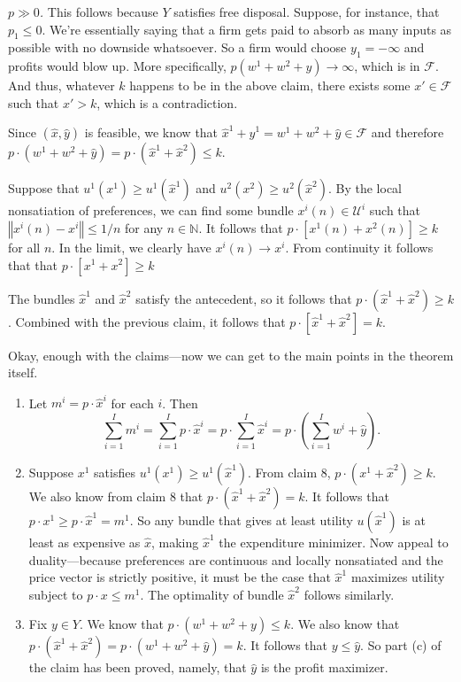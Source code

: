 \documentclass[12pt]{article}
\newcommand{\norm}[1]{\left\Vert{#1}\right\Vert}
\newcommand{\N}{\mathbb{N}}
\newcommand{\sumi}{\sum_{i=1}^I}
\theoremstyle{definition}
\begin{document}
\begin{claim}
	\emph{$p \gg 0$.} This follows because $Y$ satisfies free disposal. Suppose, for instance, that $p_1 \leq 0$. We're essentially saying that a firm gets paid to absorb as many inputs as possible with no downside whatsoever. So a firm would choose $y_1 = -\infty$ and profits would blow up. More specifically, $p (w^1 + w^2 + y) \rightarrow \infty$, which is in $\mathcal{F}$. And thus, whatever $k$ happens to be in the above claim, there exists some $x' \in \mathcal{F}$ such that $x' > k$, which is a contradiction. 
\end{claim}

\begin{claim}
	Since $(\hat{x}, \hat{y})$ is feasible, we know that $\hat{x}^1 + \hat{y}^1  = w^1 + w^2 + \hat{y} \in \mathcal{F}$ and therefore $p \cdot  (w^1 + w^2 + \hat{y}) = p \cdot (\hat{x}^1 + \hat{x}^2) \leq k$.
\end{claim}

\begin{claim}
	Suppose that $u^1(x^1) \geq u^1(\hat{x}^1)$ and $u^2(x^2) \geq u^2(\hat{x}^2)$. By the local nonsatiation of preferences, we can find some bundle $x^i(n) \in \mathcal{U}^i$ such that $\norm{x^i(n) - x^i} \leq 1/n$ for any $n \in \N$. It follows that $p \cdot[ x^1(n)+x^2(n)] \geq k$ for all $n$. In the limit, we clearly have $x^i(n) \rightarrow x^i$. From continuity it follows that that $p \cdot[ x^1+x^2] \geq k$
	
	The bundles $\hat{x}^1$ and $\hat{x}^2$ satisfy the antecedent, so it follows that $p \cdot ( \hat{x}^1+\hat{x}^2 ) \geq k$. Combined with the previous claim, it follows that $p \cdot[ \hat{x}^1+\hat{x}^2] = k$.
\end{claim}


Okay, enough with the claims---now we can get to the main points in the theorem itself.
\begin{enumerate}
	\item Let $m^i = p \cdot \hat{x}^i$ for each $i$. Then
		\[\sumi m^i = \sumi p \cdot \hat{x}^i = p  \cdot  \sumi \hat{x}^i = p\cdot \left(\sumi w^i + \hat{y} \right).	\]
	\item Suppose $x^1$ satisfies $u^1(x^1) \geq u^1(\hat{x}^1)$. From claim 8, $p \cdot (x^1 + \hat{x}^2) \geq k$. We also know from claim 8 that $p \cdot ( \hat{x}^1 + \hat{x}^2) = k$. It follows that $p \cdot x^1 \geq p \cdot \hat{x}^1 = m^1$. So any bundle that gives at least utility $u( \hat{x}^1)$ is at least as expensive as $\hat{x}$, making $\hat{x}^1$ the expenditure minimizer. Now appeal to duality---because preferences are continuous and locally nonsatiated and the price vector is strictly positive, it must be the case that $\hat{x}^1$ maximizes utility subject to $p \cdot x \leq m^1$. The optimality of bundle $\hat{x}^2$ follows similarly. 
	\item Fix $y \in Y$. We know that $p \cdot (w^1 + w^2 + y) \leq k$. We also know that $p \cdot (\hat{x}^1 + \hat{x}^2 )= p \cdot (w^1 + w^2 + \hat{y})= k$. It follows that $y \leq \hat{y}$. So part (c) of the claim has been proved, namely, that $\hat{y}$ is the profit maximizer. 
\end{enumerate}
\end{document}
